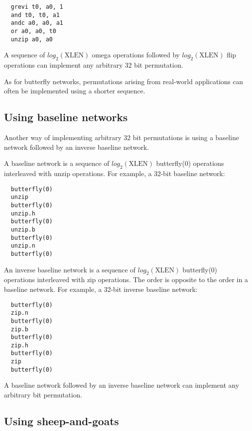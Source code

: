 \begin{verbatim}
  grevi t0, a0, 1
  and t0, t0, a1
  andc a0, a0, a1
  or a0, a0, t0
  unzip a0, a0
\end{verbatim}

A sequence of $log_2(\textrm{XLEN})$ omega operations followed by
$log_2(\textrm{XLEN})$ flip operations can implement any arbitrary 32 bit
permutation.

As for butterfly networks, permutations arising from real-world applications
can often be implemented using a shorter sequence.


\subsection{Using baseline networks}

Another way of implementing arbitrary 32 bit permutations is using a
baseline network followed by an inverse baseline network.

A baseline network is a sequence of $log_2(\textrm{XLEN})$ butterfly(0)
operations interleaved with unzip operations. For example, a 32-bit
baseline network:

\begin{verbatim}
  butterfly(0)
  unzip
  butterfly(0)
  unzip.h
  butterfly(0)
  unzip.b
  butterfly(0)
  unzip.n
  butterfly(0)
\end{verbatim}

An inverse baseline network is a sequence of $log_2(\textrm{XLEN})$ butterfly(0)
operations interleaved with zip operations. The order is opposite to the
order in a baseline network. For example, a 32-bit inverse baseline network:

\begin{verbatim}
  butterfly(0)
  zip.n
  butterfly(0)
  zip.b
  butterfly(0)
  zip.h
  butterfly(0)
  zip
  butterfly(0)
\end{verbatim}

A baseline network followed by an inverse baseline network can implement
any arbitrary bit permutation.


\subsection{Using sheep-and-goats}

